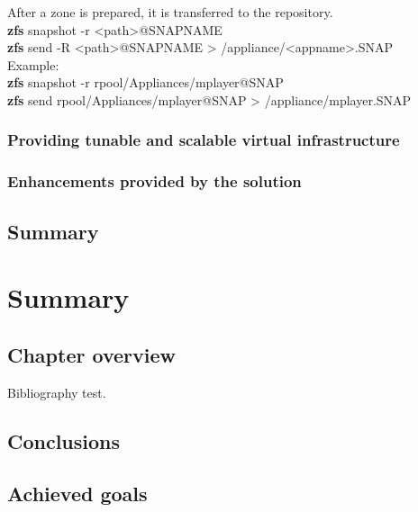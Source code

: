 \documentclass[11pt]{book}
\begin{document}
          After a zone is prepared, it is transferred to the repository. \\

          \textbf{zfs} snapshot -r <path>@SNAPNAME \\

          \textbf{zfs} send -R <path>@SNAPNAME > /appliance/<appname>.SNAP \\

          Example: \\
          \textbf{zfs} snapshot -r rpool/Appliances/mplayer@SNAP \\
          \textbf{zfs} send rpool/Appliances/mplayer@SNAP > /appliance/mplayer.SNAP \\
        
      
      \subsection{Providing tunable and scalable virtual infrastructure}

      \subsection{Enhancements provided by the solution}
      \label{sub:}
      


    \section*{Summary}


  \chapter{Summary}

    \section*{Chapter overview}

      Bibliography \cite{mittelbach2004} test.
	
		

    \section{Conclusions}
	
		

    \section{Achieved goals}
	
\end{document}
